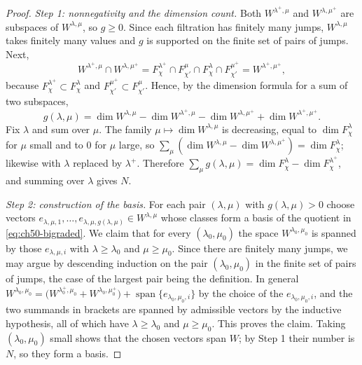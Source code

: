 \begin{proof}
\emph{Step 1: nonnegativity and the dimension count.}  Both
$W^{\lambda^+,\mu}$ and $W^{\lambda,\mu^+}$ are subspaces of
$W^{\lambda,\mu}$, so $g\ge0$.  Since each filtration has finitely many
jumps, $W^{\lambda,\mu}$ takes finitely many values and $g$ is
supported on the finite set of pairs of jumps.  Next,
\[
 W^{\lambda^+,\mu}\cap W^{\lambda,\mu^+}
 =F^{\lambda^+}_\chi\cap F^\mu_{\chi'}\cap F^\lambda_\chi\cap
     F^{\mu^+}_{\chi'}
 =W^{\lambda^+,\mu^+},
\]
because $F^{\lambda^+}_\chi\subset F^\lambda_\chi$ and
$F^{\mu^+}_{\chi'}\subset F^\mu_{\chi'}$.  Hence, by the dimension
formula for a sum of two subspaces,
\[
 g(\lambda,\mu)
 =\dim W^{\lambda,\mu}-\dim W^{\lambda^+,\mu}
    -\dim W^{\lambda,\mu^+}+\dim W^{\lambda^+,\mu^+}.
\]
Fix $\lambda$ and sum over $\mu$.  The family
$\mu\mapsto\dim W^{\lambda,\mu}$ is decreasing, equal to
$\dim F^\lambda_\chi$ for $\mu$ small and to $0$ for $\mu$ large,
so $\sum_\mu(\dim W^{\lambda,\mu}-\dim W^{\lambda,\mu^+})
=\dim F^\lambda_\chi$; likewise with $\lambda$ replaced by
$\lambda^+$.  Therefore
$\sum_\mu g(\lambda,\mu)=\dim F^\lambda_\chi-\dim F^{\lambda^+}_\chi$,
and summing over $\lambda$ gives $N$.

\emph{Step 2: construction of the basis.}  For each pair $(\lambda,\mu)$
with $g(\lambda,\mu)>0$ choose vectors
$e_{\lambda,\mu,1},\dots,e_{\lambda,\mu,g(\lambda,\mu)}\in W^{\lambda,\mu}$
whose classes form a basis of the quotient in \eqref{eq:ch50-bigraded}.  We
claim that for every $(\lambda_0,\mu_0)$ the space
$W^{\lambda_0,\mu_0}$ is spanned by those $e_{\lambda,\mu,i}$ with
$\lambda\ge\lambda_0$ and $\mu\ge\mu_0$.  Since there are finitely many
jumps, we may argue by descending induction on the pair
$(\lambda_0,\mu_0)$ in the finite set of pairs of jumps, the case of the
largest pair being the definition.  In general
$W^{\lambda_0,\mu_0}=\bigl(W^{\lambda_0^+,\mu_0}+W^{\lambda_0,\mu_0^+}
\bigr)+\operatorname{span}\{e_{\lambda_0,\mu_0,i}\}$ by the choice of the
$e_{\lambda_0,\mu_0,i}$, and the two summands in brackets are spanned by
admissible vectors by the inductive hypothesis, all of which have
$\lambda\ge\lambda_0$ and $\mu\ge\mu_0$.  This proves the claim.
Taking $(\lambda_0,\mu_0)$ small shows that the chosen vectors span
$W$; by Step 1 their number is $N$, so they form a basis.


\end{proof}
